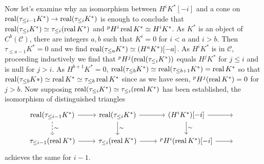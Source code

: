 \documentclass[deligne.tex]{subfiles}
\begin{document}
Now let's examine why an isomorphism between $H^iK^*[-i]$ and a cone on
$\operatorname{real}(\tau_{\leq{i-1}}K^*)\rightarrow\operatorname{real}(\tau_{\leq i}K^*)$ is enough to 
conclude that $\operatorname{real}(\tau_{\leq i}K^*)\simeq\tau_{\leq i}(\operatorname{real} K^*)$
and $^pH^i\operatorname{real} K^*\simeq H^iK^*$.
As $K^*$ is an object of $C^b(\mathcal C)$, there are integers $a,b$
such that $K^i=0$ for $i<a$ and $i>b$.
Then $\tau_{\leq a-1}K^*=0$ and we find
$\operatorname{real}(\tau_{\leq a}K^*)\simeq(H^aK^*)[-a]$.
As $H^iK^*$ is in $\mathcal C$, proceeding inductively we find that
$^pH^j(\operatorname{real}(\tau_{\leq i}K^*))$ equals $H^jK^*$ for $j\leq i$ and is null
for $j>i$. As $H^{b+1}K^*=0$,
$\operatorname{real}(\tau_{\leq b} K^*)\simeq\operatorname{real}(\tau_{\leq b+1}K^*)=\operatorname{real} K^*$ so that
$\operatorname{real}(\tau_{\leq b}K*)\simeq\operatorname{real} K^*\simeq\tau_{\leq b}\operatorname{real} K^*$ since
as we have seen, $^pH^j(\operatorname{real} K^*)=0$ for $j>b$.
Now supposing $\operatorname{real}(\tau_{\leq i}K^*)\simeq\tau_{\leq i}(\operatorname{real} K^*)$ has
been established, the isomorphism of distinguished triangles
\begin{equation*}\begin{tikzcd}
	\real(\tau_{\leq i-1}K^*)\arrow[r]\arrow[d,dashed,"\sim"]
	&\real(\tau_{\leq i} K^*)\arrow[r]\arrow[d,"\sim"]
	&(H^iK^*)[-i]\arrow[r]\arrow[d,"\sim"]&\; \\
	\tau_{\leq i-1}(\real K^*)\arrow[r]
	&\tau_{\leq i}(\real K^*)\arrow[r]
	&^pH^i(\real K^*)[-i]\arrow[r]&\;
\end{tikzcd}\end{equation*}
achieves the same for $i-1$.
\end{document}
